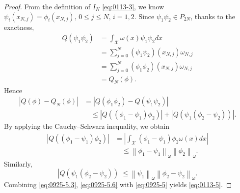 \documentclass[pdflatex,sn-aps]{sn-jnl}%
\theoremstyle{thmstyleone}%
\theoremstyle{thmstyletwo}%
\theoremstyle{thmstylethree}%
\begin{document}
\begin{proof}
  From the definition of $I_{N}$ \eqref{eq:0113-3}, we know $\psi_i\left(x_{N,j}\right)=\phi_i\left(x_{N,j}\right), \,0 \leqslant j \leqslant N, \,i=1,2$.
  Since $\psi_1 \psi_2 \in P_{2 N}$, thanks to the
  exactness,
  \begin{equation}\label{eq:0925-4}
    \begin{aligned}
    Q\left(\psi_1 \psi_2\right) & =\int_{\mathcal{X}} \omega(x) \psi_1 \psi_2 d x \\
    & =\sum_{j=0}^N\left(\psi_1 \psi_2\right)\left(x_{N,j}\right) \omega_{N,j} \\
    & =\sum_{j=0}^N\left(\phi_1 \phi_2\right)\left(x_{N,j}\right) \omega_{N,j} \\
    & =Q_{N}(\phi).
    \end{aligned}
  \end{equation}
  Hence
  \begin{equation}\label{eq:0925-5}
    \begin{aligned}
    \left|Q(\phi)-Q_{N}(\phi)\right| & =\left|Q\left(\phi_1 \phi_2\right)-Q\left(\psi_1 \psi_2\right)\right| \\
    &\quad \leqslant \left|Q\left(\left(\phi_1-\psi_1\right) \phi_2\right)\right|+\left|Q\left(\psi_1\left(\phi_2-\psi_2\right)\right)\right|.
    \end{aligned}
  \end{equation}
  By applying the Cauchy--Schwarz inequality, we obtain
  \begin{equation}\label{eq:0925-5.3}
    \begin{aligned}
    \left|Q\left(\left(\phi_1-\psi_1\right) \phi_2\right)\right| & =\left|\int_{\mathcal{X}}\left(\phi_1-\psi_1\right) \phi_2 \omega(x) d x\right| \\
    &\quad \leqslant\left\|\phi_1-\psi_1\right\|_\omega\left\|\phi_2\right\|_\omega.
    \end{aligned}
  \end{equation}
  Similarly,
  \begin{equation}\label{eq:0925-5.6}
    \left|Q\left(\psi_1\left(\phi_2-\psi_2\right)\right)\right| \leqslant\left\|\psi_1\right\|_\omega\left\|\phi_2-\psi_2\right\|_\omega.
  \end{equation}
  Combining \eqref{eq:0925-5.3}, \eqref{eq:0925-5.6} with \eqref{eq:0925-5}
  yields \eqref{eq:0113-5}.
\end{proof}
\end{document}
